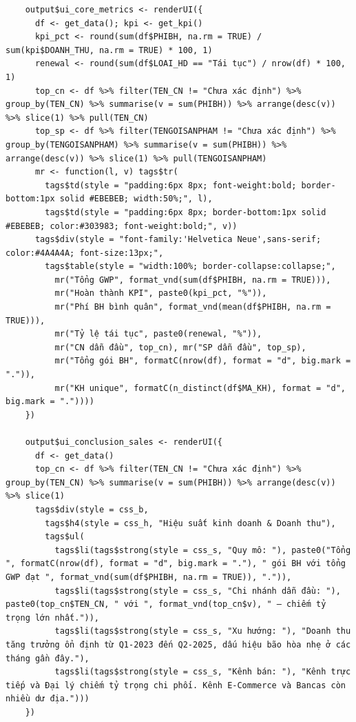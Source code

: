\documentclass[12pt, a4paper]{article}
\begin{document}
\begin{lstlisting}
    output$ui_core_metrics <- renderUI({
      df <- get_data(); kpi <- get_kpi()
      kpi_pct <- round(sum(df$PHIBH, na.rm = TRUE) / sum(kpi$DOANH_THU, na.rm = TRUE) * 100, 1)
      renewal <- round(sum(df$LOAI_HD == "Tái tục") / nrow(df) * 100, 1)
      top_cn <- df %>% filter(TEN_CN != "Chưa xác định") %>% group_by(TEN_CN) %>% summarise(v = sum(PHIBH)) %>% arrange(desc(v)) %>% slice(1) %>% pull(TEN_CN)
      top_sp <- df %>% filter(TENGOISANPHAM != "Chưa xác định") %>% group_by(TENGOISANPHAM) %>% summarise(v = sum(PHIBH)) %>% arrange(desc(v)) %>% slice(1) %>% pull(TENGOISANPHAM)
      mr <- function(l, v) tags$tr(
        tags$td(style = "padding:6px 8px; font-weight:bold; border-bottom:1px solid #EBEBEB; width:50%;", l),
        tags$td(style = "padding:6px 8px; border-bottom:1px solid #EBEBEB; color:#303983; font-weight:bold;", v))
      tags$div(style = "font-family:'Helvetica Neue',sans-serif; color:#4A4A4A; font-size:13px;",
        tags$table(style = "width:100%; border-collapse:collapse;",
          mr("Tổng GWP", format_vnd(sum(df$PHIBH, na.rm = TRUE))),
          mr("Hoàn thành KPI", paste0(kpi_pct, "%")),
          mr("Phí BH bình quân", format_vnd(mean(df$PHIBH, na.rm = TRUE))),
          mr("Tỷ lệ tái tục", paste0(renewal, "%")),
          mr("CN dẫn đầu", top_cn), mr("SP dẫn đầu", top_sp),
          mr("Tổng gói BH", formatC(nrow(df), format = "d", big.mark = ".")),
          mr("KH unique", formatC(n_distinct(df$MA_KH), format = "d", big.mark = "."))))
    })

    output$ui_conclusion_sales <- renderUI({
      df <- get_data()
      top_cn <- df %>% filter(TEN_CN != "Chưa xác định") %>% group_by(TEN_CN) %>% summarise(v = sum(PHIBH)) %>% arrange(desc(v)) %>% slice(1)
      tags$div(style = css_b,
        tags$h4(style = css_h, "Hiệu suất kinh doanh & Doanh thu"),
        tags$ul(
          tags$li(tags$strong(style = css_s, "Quy mô: "), paste0("Tổng ", formatC(nrow(df), format = "d", big.mark = "."), " gói BH với tổng GWP đạt ", format_vnd(sum(df$PHIBH, na.rm = TRUE)), ".")),
          tags$li(tags$strong(style = css_s, "Chi nhánh dẫn đầu: "), paste0(top_cn$TEN_CN, " với ", format_vnd(top_cn$v), " — chiếm tỷ trọng lớn nhất.")),
          tags$li(tags$strong(style = css_s, "Xu hướng: "), "Doanh thu tăng trưởng ổn định từ Q1-2023 đến Q2-2025, dấu hiệu bão hòa nhẹ ở các tháng gần đây."),
          tags$li(tags$strong(style = css_s, "Kênh bán: "), "Kênh trực tiếp và Đại lý chiếm tỷ trọng chi phối. Kênh E-Commerce và Bancas còn nhiều dư địa.")))
    })


\end{lstlisting}
\end{document}

